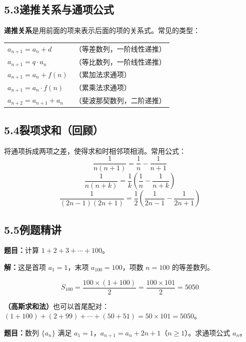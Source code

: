 \documentclass[12pt, a4paper]{ctexart}
\begin{document}
\subsection*{5.3\quad 递推关系与通项公式}

\begin{knowledgebox}[递推关系]
\textbf{递推关系}是用前面的项来表示后面的项的关系式。常见的类型：\\[4pt]
\begin{tabular}{ll}
$a_{n+1}=a_n+d$ & （等差数列，一阶线性递推）\\
$a_{n+1}=q\cdot a_n$ & （等比数列，一阶线性递推）\\
$a_{n+1}=a_n+f(n)$ & （累加法求通项）\\
$a_{n+1}=a_n\cdot f(n)$ & （累乘法求通项）\\
$a_{n+2}=a_{n+1}+a_n$ & （斐波那契数列，二阶递推）
\end{tabular}
\end{knowledgebox}

\subsection*{5.4\quad 裂项求和（回顾）}

\begin{knowledgebox}[裂项求和]
将通项拆成两项之差，使得求和时相邻项相消。常用公式：
\[\frac{1}{n(n+1)}=\frac{1}{n}-\frac{1}{n+1}\]
\[\frac{1}{n(n+k)}=\frac{1}{k}\left(\frac{1}{n}-\frac{1}{n+k}\right)\]
\[\frac{1}{(2n-1)(2n+1)}=\frac{1}{2}\left(\frac{1}{2n-1}-\frac{1}{2n+1}\right)\]
\end{knowledgebox}

\subsection*{5.5\quad 例题精讲}

\begin{examplebox}[【例12】等差数列求和]
\textbf{题目：}计算 $1+2+3+\cdots+100$。
\end{examplebox}

\textbf{解：}\;这是首项 $a_1=1$，末项 $a_{100}=100$，项数 $n=100$ 的等差数列。

\[S_{100}=\frac{100\times(1+100)}{2}=\frac{100\times 101}{2}=\boxed{5050}\]

\textbf{（高斯求和法）}也可以首尾配对：$(1+100)+(2+99)+\cdots+(50+51)=50\times 101=5050$。

\begin{examplebox}[【例13】递推与通项]
\textbf{题目：}数列 $\{a_n\}$ 满足 $a_1=1$，$a_{n+1}=a_n+2n+1$（$n\geqslant 1$）。求通项公式 $a_n$。
\end{examplebox}
\end{document}
